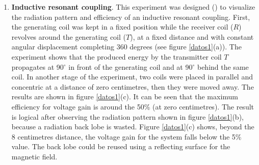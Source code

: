 \documentclass{intech}
\begin{document}
\begin{enumerate}
\item {\bf Inductive resonant coupling}. This experiment was designed (\cite{SOMI}) to visualize the radiation pattern and efficiency of an inductive resonant coupling. First, the generating coil was kept in a fixed position while the receiver coil ($R$) revolves around the generating coil ($T$), at a fixed distance and with constant angular displacement completing 360 degrees (see figure \ref{datos1}(a)). The experiment shows that the produced energy by the transmitter coil $T$ propagates at 90$^\circ$ in front of the generating coil and at 90$^\circ$ behind the same coil. In another stage of the experiment, two coils were placed in parallel and concentric at a distance of zero centimetres, then they were moved away. The results are shown in figure \ref{datos1}(c). It can be seen that the maximum efficiency for voltage gain is around the 50\% (at zero centimetres). The result is logical after observing  the radiation pattern shown in figure \ref{datos1}(b), because a radiation back lobe is wasted. Figure \ref{datos1}(c) shows, beyond the 8 centimetres distance, the voltage gain for the system falls below the 5\% value. The back lobe could be reused using a reflecting surface for the magnetic field.


\end{enumerate}
\end{document}
